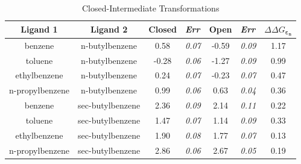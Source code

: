 \documentclass[T4paper.tex]{subfiles}
\begin{document}
\begin{table}[!htb]
\centering
\caption{Closed-Intermediate Transformations}
\label{tbl:C-I}
\begin{tabular}{|c|c|c|l|c|l|c|}
\hline
\textbf{Ligand 1}                       & \textbf{Ligand 2}                        & {\color[HTML]{800080} \textbf{Closed}} & {\color[HTML]{800080} \textit{Err}} & {\color[HTML]{008000} \textbf{Open}} & {\color[HTML]{008000} \textit{Err}} & $\Delta\Delta G_{\boldsymbol{\varepsilon_n}}$            \\ \hline
\cellcolor[HTML]{800080}benzene         & \cellcolor[HTML]{00FFFF}n-butylbenzene   & 0.58                                   & \textit{0.07}                       & -0.59                                & \textit{0.09}                       & \cellcolor[HTML]{FFCCC9}1.17 \\ \hline
\cellcolor[HTML]{800080}toluene         & \cellcolor[HTML]{00FFFF}n-butylbenzene   & -0.28                                  & \textit{0.06}                       & -1.27                                & \textit{0.09}                       & \cellcolor[HTML]{9AFF99}0.99 \\ \hline
\cellcolor[HTML]{800080}ethylbenzene    & \cellcolor[HTML]{00FFFF}n-butylbenzene   & 0.24                                   & \textit{0.07}                       & -0.23                                & \textit{0.07}                       & \cellcolor[HTML]{9AFF99}0.47 \\ \hline
\cellcolor[HTML]{800080}n-propylbenzene & \cellcolor[HTML]{00FFFF}n-butylbenzene   & 0.99                                   & \textit{0.06}                       & 0.63                                 & \textit{0.04}                       & \cellcolor[HTML]{9AFF99}0.36 \\ \hline
\cellcolor[HTML]{800080}benzene         & \cellcolor[HTML]{00FFFF}sec-butylbenzene & 2.36                                   & \textit{0.09}                       & 2.14                                 & \textit{0.11}                       & \cellcolor[HTML]{9AFF99}0.22 \\ \hline
\cellcolor[HTML]{800080}toluene         & \cellcolor[HTML]{00FFFF}sec-butylbenzene & 1.47                                   & \textit{0.07}                       & 1.14                                 & \textit{0.09}                       & \cellcolor[HTML]{9AFF99}0.33 \\ \hline
\cellcolor[HTML]{800080}ethylbenzene    & \cellcolor[HTML]{00FFFF}sec-butylbenzene & 1.90                                   & \textit{0.08}                       & 1.77                                 & \textit{0.07}                       & \cellcolor[HTML]{9AFF99}0.13 \\ \hline
\cellcolor[HTML]{800080}n-propylbenzene & \cellcolor[HTML]{00FFFF}sec-butylbenzene & 2.86                                   & \textit{0.06}                       & 2.67                                 & \textit{0.05}                       & \cellcolor[HTML]{9AFF99}0.19 \\ \hline
\end{tabular}
\end{table}
\end{document}
